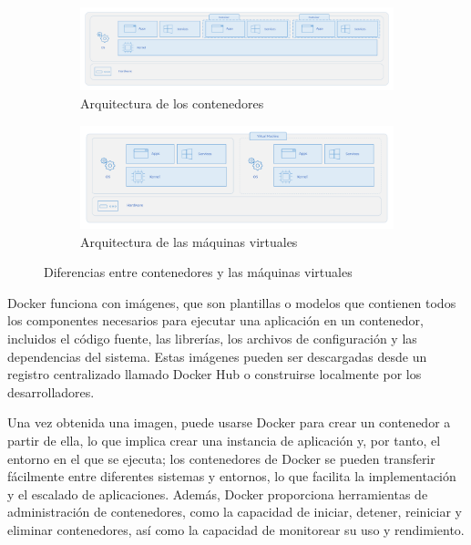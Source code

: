             \begin{figure}[h]
                \centering
                
                \begin{subfigure}[h]{\textwidth}
                    \includegraphics[width=\textwidth]{images/Diagramas/Esquema de Contenedores.png}
                    \caption{Arquitectura de los contenedores}
                    \label{fig:arquitectura-contenedores}
                \end{subfigure}
                
                \begin{subfigure}[h]{\textwidth}
                    \includegraphics[width=\textwidth]{images/Diagramas/Esquema de MVs.png}
                    \caption{Arquitectura de las máquinas virtuales}
                    \label{fig:arquitectura-maquinasvirtuales}
                \end{subfigure}
                
                \caption{Diferencias entre contenedores y las máquinas virtuales}
                \label{fig:contenedores-vs-maquinasvirtuales}
            \end{figure}
            
            Docker funciona con imágenes, que son plantillas o modelos que contienen todos los componentes necesarios para ejecutar una aplicación en un contenedor, incluidos el código fuente, las librerías, los archivos de configuración y las dependencias del sistema. Estas imágenes pueden ser descargadas desde un registro centralizado llamado Docker Hub o construirse localmente por los desarrolladores.
            
            Una vez obtenida una imagen, puede usarse Docker para crear un contenedor a partir de ella, lo que implica crear una instancia de aplicación y, por tanto, el entorno en el que se ejecuta; los contenedores de Docker se pueden transferir fácilmente entre diferentes sistemas y entornos, lo que facilita la implementación y el escalado de aplicaciones. Además, Docker proporciona herramientas de administración de contenedores, como la capacidad de iniciar, detener, reiniciar y eliminar contenedores, así como la capacidad de monitorear su uso y rendimiento.
            

